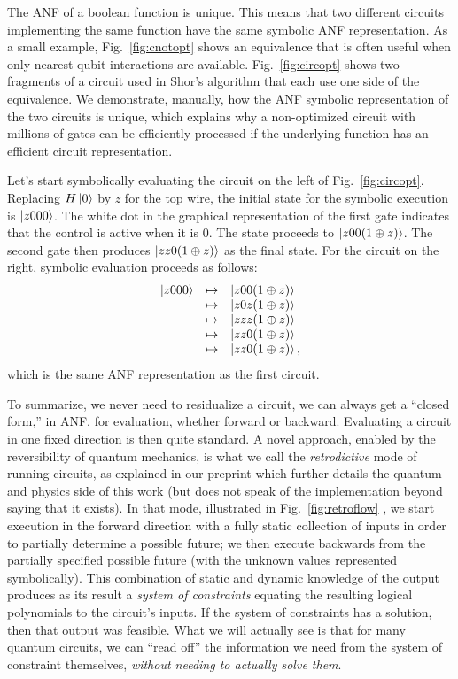 \documentclass[sigplan,screen]{acmart}
\theoremstyle{definition}
\begin{document}
The ANF of a boolean function is unique. This means that two different
circuits implementing the same function have the same symbolic ANF
representation. As a small example, Fig.~\ref{fig:cnotopt} shows an
equivalence that is often useful when only nearest-qubit interactions
are available. Fig.~\ref{fig:circopt} shows two fragments of a circuit
used in Shor's algorithm that each use one side of the equivalence. We
demonstrate, manually, how the ANF symbolic representation of the two
circuits is unique, which explains why a non-optimized circuit with
millions of gates can be efficiently processed if the underlying
function has an efficient circuit representation.

Let's start symbolically evaluating the circuit on the left of
Fig.~\ref{fig:circopt}. Replacing $H\ket{0}$ by $z$ for the top wire, the
initial state for the symbolic execution is $\ket{z000}$.  The white
dot in the graphical representation of the first gate indicates that
the control is active when it is 0. The state proceeds to
$\ket{z00(1\oplus z)}$. The second gate then produces
$\ket{zz0(1\oplus z)}$ as the final state. For the circuit on the
right, symbolic evaluation proceeds as follows:
\[\begin{array}{rcl}
    \ket{z000}  &\mapsto& \ket{z00(1\oplus z)} \\
                &\mapsto& \ket{z0z(1\oplus z)} \\
                &\mapsto& \ket{zzz(1\oplus z)} \\
                &\mapsto& \ket{zz0(1\oplus z)} \\
                &\mapsto& \ket{zz0(1\oplus z)} ,
\end{array}\]
which is the same ANF representation as the first circuit.

To summarize, we never need to residualize a circuit, we can always
get a ``closed form,'' in ANF, for evaluation, whether forward or
backward. Evaluating a circuit in one fixed direction is then quite
standard. A novel approach, enabled by the reversibility of quantum
mechanics, is what we call the \emph{retrodictive} mode of running
circuits, as explained in our preprint \cite{retrodictive} which
further details the quantum and physics side of this work (but
does not speak of the implementation beyond saying that it exists).
In that mode, illustrated in
Fig.~\ref{fig:retroflow} , we start execution in the forward direction
with a fully static collection of inputs in order to partially
determine a possible future; we then execute backwards from the
partially specified possible future (with the unknown values
represented symbolically). This combination of static and dynamic
knowledge of the output produces as its result a \emph{system of
constraints} equating the resulting logical polynomials to the
circuit's inputs. If the system of constraints has a solution, then
that output was feasible. What we will actually see is that for many
quantum circuits, we can ``read off'' the information we need from the
system of constraint themselves, \emph{without needing to actually
solve them}.
\end{document}
